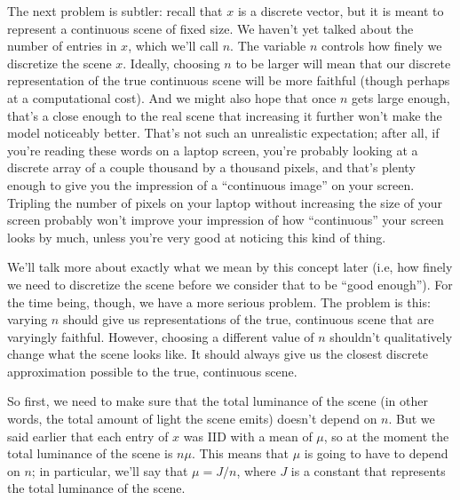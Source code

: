 The next problem is subtler: recall that $x$ is a discrete vector, but it is meant to represent a continuous scene of fixed size. We haven't yet talked about the number of entries in $x$, which we'll call $n$. The variable $n$ controls how finely we discretize the scene $x$. Ideally, choosing $n$ to be larger will mean that our discrete representation of the true continuous scene will be more faithful (though perhaps at a computational cost). And we might also hope that once $n$ gets large enough, that's a close enough to the real scene that increasing it further won't make the model noticeably better. That's not such an unrealistic expectation; after all, if you're reading these words on a laptop screen, you're probably looking at a discrete array of a couple thousand by a thousand pixels, and that's plenty enough to give you the impression of a ``continuous image'' on your screen. Tripling the number of pixels on your laptop without increasing the size of your screen probably won't improve your impression of how ``continuous'' your screen looks by much, unless you're very good at noticing this kind of thing.

We'll talk more about exactly what we mean by this concept later (i.e, how finely we need to discretize the scene before we consider that to be ``good enough''). For the time being, though, we have a more serious problem. The problem is this: varying $n$ should give us representations of the true, continuous scene that are varyingly faithful. However, choosing a different value of $n$ shouldn't qualitatively change what the scene looks like. It should always give us the closest discrete approximation possible to the true, continuous scene.

So first, we need to make sure that the total luminance of the scene (in other words, the total amount of light the scene emits) doesn't depend on $n$. But we said earlier that each entry of $x$ was IID with a mean of $\mu$, so at the moment the total luminance of the scene is $n \mu$. This means that $\mu$ is going to have to depend on $n$; in particular, we'll say that $\mu = J/n$, where $J$ is a constant that represents the total luminance of the scene.

